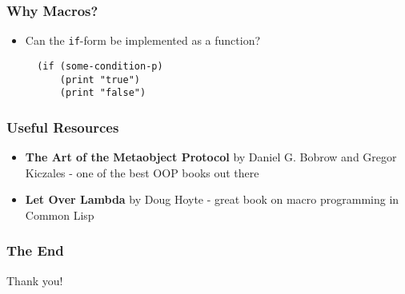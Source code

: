 \documentclass{beamer}
\begin{document}
\begin{frame}[fragile]
  \frametitle{Why Macros?}
  \begin{itemize}
  \item Can the \texttt{if}-form be implemented as a function?
\begin{verbatim}
  (if (some-condition-p)
      (print "true")
      (print "false")
\end{verbatim}
  \end{itemize}
\end{frame}

\begin{frame}
  \frametitle{Useful Resources}
  \begin{itemize}
  \item \textbf{The Art of the Metaobject Protocol} by Daniel G. Bobrow and
    Gregor Kiczales - one of the best OOP books out there
  \item \textbf{Let Over Lambda} by Doug Hoyte - great book on macro programming
    in Common Lisp
  \end{itemize}
\end{frame}

\begin{frame}
  \frametitle{The End}
  \begin{center}
    Thank you!
  \end{center}
\end{frame}
\end{document}

